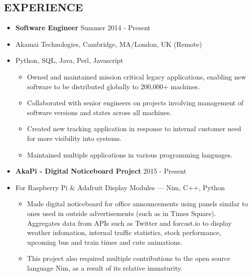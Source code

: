 \documentclass[line,margin]{res}
\newcommand\oindent{0em}
\newcommand\lindent{1.5em}
\newcommand\spacing{0.6em}
\newcommand\si{\item[]}
\newenvironment{secretlist}[1]{\begin{itemize}[noitemsep,leftmargin=#1,nolistsep]}{\end{itemize}}
\begin{document}
    \address{\addr}
    \address{\email / \phone}

    \begin{resume}
        \section{EXPERIENCE}
            \begin{secretlist}{\oindent}
                \si \textbf{Software Engineer} \hfill Summer 2014 - Present
                \si Akamai Technologies, Cambridge, MA/London, UK (Remote)
                \si Python, SQL, Java, Perl, Javascript
                \begin{secretlist}{\lindent}
                    \si Owned and maintained mission critical legacy applications, enabling new software to be distributed globally to 200,000+ machines.
                    \si Collaborated with senior engineers on projects involving management of software versions and states across all machines.
                    \si Created new tracking application in response to internal customer need for more visibility into systems.
                    \si Maintained multiple applications in various programming languages.
                \end{secretlist}
            \end{secretlist}
            \vspace{\spacing}
            \begin{secretlist}{\oindent}
                \si \textbf{AkaPi - Digital Noticeboard Project} \hfill 2015 - Present
                \si For Raspberry Pi \& Adafruit Display Modules --- Nim, C++, Python
                \begin{secretlist}{\lindent}
                    \si Made digital noticeboard for office announcements using panels similar to ones used in outside advertisements (such as in Times Square). Aggregates data from APIs such as Twitter and forcast.io to display weather infomation, internal traffic statistics, stock performance, upcoming bus and train times and cute animations.
                    \si This project also required multiple contributions to the open source language Nim, as a result of its relative immaturity.
                \end{secretlist}
            \end{secretlist}
            \vspace{\spacing}

\end{resume}
\end{document}

